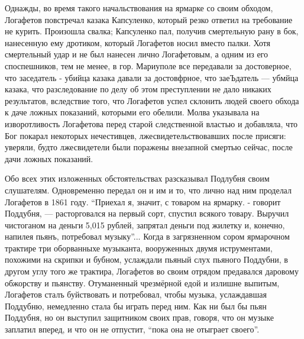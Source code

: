 Однажды, во время такого начальствования на ярмарке со своим обходом, Логафетов повстречал казака
Капсуленко, который резко ответил на требование не курить.
Произошла свалка; Капсуленко пал, получив смертельную рану в бок, нанесенную ему дротиком,
который Логафетов носил вместо палки. Хотя смертельный удар и не был нанесен лично
Логафетовым, а одним из его споспешников, тем не менее, в гор. Мариуполе
все передавали за достоверное, что заседатель - убийца казака
давали за достовфрное, что заеЪдатель — убмйца казака, что
разследование по делу об этом преступлении не дало никаких результатов, вследствие того, что
Логафетов успел склонить людей своего обхода к даче ложных показаний, которыми его обелили.
Молва указывала на изворотливость Логафетова перед старой следственной властью и добавляла, что Бог
покарал некоторых нечестивцев, лжесвидетельствовавших после присяги: уверяли, будто
лжесвидетели были поражены внезапной смертью сейчас,
после дачи ложных показаний.

Обо всех этих изложенных обстоятельствах разсказывал Подлубня своим слушателям. 
Одновременно передал он и им и то, что лично над ним проделал Логафетов в 1861 году.
``Приехал я, значит, с товаром на ярмарку. - 
говорит Поддубня, — расторговался на первый сорт,
спустил всякого товару. Выручил чистоганом на деньги
5,015 рублей, запрятал деньги под жилетку и, конечно,
напилея пьянъ, потребовал музыку''...
Когда в загрязненном сором ярмарочном трактире три оборванныхе музыканта,
вооруженных двумя иструментами, похожими на скрипки и бубном, услаждали пьяный
слух пьяного Поддубни, в другом углу того же трактира, Логафетов во своим
отрядом предавался даровому обжорству и пьянству. Отуманенный чрезмёрной едой и
излишне выпитым, Логафетов сталъ буйствовать и потребовал, чтобы музыка,
услаждавшая Поддубню, немедленно стала бы играть перед ним. Как ни был бы пьян
Поддубня, но он выступил защитником своих прав, говоря, что он музыке заплатил
вперед, и что он не отпустит, ``пока она не отыграет своего''.

